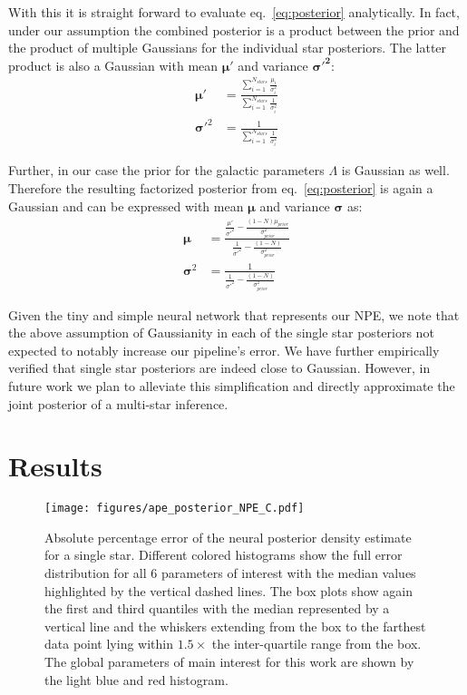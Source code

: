 \documentclass{aa}
\begin{document}
With this it is straight forward to evaluate eq.~\ref{eq:posterior} analytically. In fact, under our assumption the combined posterior is a product between the prior and the product of multiple Gaussians for the individual star posteriors. The latter product is also a Gaussian with mean $\mathbf{\mu'}$ and variance $\mathbf{\sigma'^2}$:
\begin{align}
    \mathbf{\mu'} &= \frac{\sum_{i=1}^{N_{stars}} \frac{\mu_i}{\sigma_i^2}}{\sum_{i=1}^{N_{stars}} \frac1{\sigma_i^2}} \\
\mathbf{\sigma'}^2 &= \frac1 {\sum_{i=1}^{N_{stars}} \frac1{\sigma_i^2}}
\end{align}

Further, in our case the prior for the galactic parameters $\Lambda$ is Gaussian as well. Therefore the resulting factorized posterior from eq.~\ref{eq:posterior} is again a Gaussian and can be expressed with mean $\mathbf{\mu}$ and variance $\mathbf{\sigma}$ as:
\begin{align}
\mathbf{\mu} &= \frac{\frac{\mu'}{\sigma'^2}-\frac{(1-N)\mu_ {prior}}{\sigma_ {prior}^2}}{\frac1{\sigma'^2}-\frac{(1-N)}{\sigma_ {prior}^2}} \\
\mathbf{\sigma}^2 &= \frac1 {\frac1{\sigma'^2}-\frac{(1-N)}{\sigma_ {prior}^2}}
\end{align}

Given the tiny and simple neural network that represents our NPE, we note that the above assumption of Gaussianity in each of the single star posteriors not expected to notably increase our pipeline's error. We have further empirically verified that single star posteriors are indeed close to Gaussian.
However, in future work we plan to alleviate this simplification and directly approximate the joint posterior of a multi-star inference.


\section{Results}
\label{sec: Results}

\begin{figure}[]
     \centering
     \texttt{[image: figures/ape\_posterior\_NPE\_C.pdf]}
     \vspace{-.5cm}
     \caption{Absolute percentage error of the neural posterior density estimate for a single star. Different colored histograms show the full error distribution for all 6 parameters of interest with the median values highlighted by the vertical dashed lines. The box plots show again the first and third quantiles with the median represented by a vertical line and the whiskers extending from the box to the farthest data point lying within $1.5\times$ the inter-quartile range from the box. The global parameters of main interest for this work are shown by the light blue and red histogram.}
     \label{fig:posterior_APE}
\end{figure}
\end{document}

